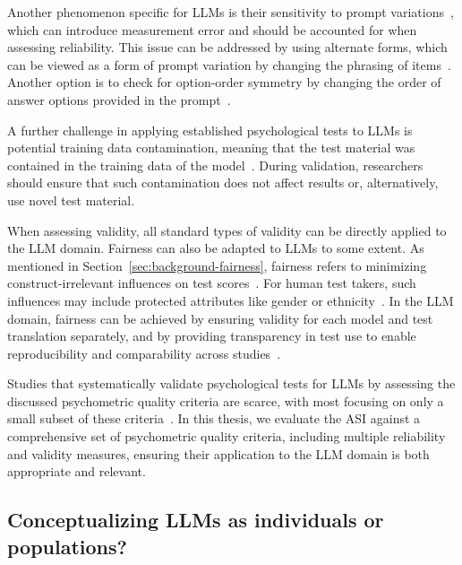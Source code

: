 \documentclass{DESSThesis}
\begin{document}
Another phenomenon specific for LLMs is their sensitivity to prompt variations~\cite{binz_using_2023, gupta_self-assessment_2024, shu_you_2024}, which can introduce measurement error and should be accounted for when assessing reliability. This issue can be addressed by using alternate forms, which can be viewed as a form of prompt variation by changing the phrasing of items~\cite{coda-forno_inducing_2023, lohn_is_2024}. Another option is to check for option-order symmetry by changing the order of answer options provided in the prompt~\cite{coda-forno_inducing_2023, gupta_self-assessment_2024}. 

A further challenge in applying established psychological tests to LLMs is potential training data contamination, meaning that the test material was contained in the training data of the model~\cite{lohn_is_2024}. During validation, researchers should ensure that such contamination does not affect results or, alternatively, use novel test material.

When assessing validity, all standard types of validity can be directly applied to the LLM domain. Fairness can also be adapted to LLMs to some extent. As mentioned in Section~\ref{sec:background-fairness}, fairness refers to minimizing construct-irrelevant influences on test scores~\cite{american_educational_research_association_standards_2014, lohn_is_2024}. For human test takers, such influences may include protected attributes like gender or ethnicity~\cite{moosbrugger_testtheorie_2020}. In the LLM domain, fairness can be achieved by ensuring validity for each model and test translation separately, and by providing transparency in test use to enable reproducibility and comparability across studies~\cite{lohn_is_2024}.

Studies that systematically validate psychological tests for LLMs by assessing the discussed psychometric quality criteria are scarce, with most focusing on only a small subset of these criteria~\cite{lohn_is_2024}. 
In this thesis, we evaluate the ASI against a comprehensive set of psychometric quality criteria, including multiple reliability and validity measures, ensuring their application to the LLM domain is both appropriate and relevant.

\subsection{Conceptualizing LLMs as individuals or populations?}
\label{sec:individual-vs-population}
\end{document}
